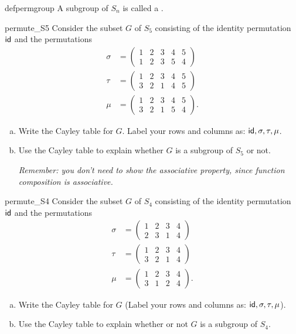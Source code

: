 \begin{defn}{defpermgroup}
A subgroup of $S_n$ is called a .
\end{defn}

\begin{exercise}{permute_S5}
Consider the subset $G$ of $S_5$ consisting of the identity
permutation ${\sf{i}d}$ and the permutations 
\begin{align*}
\sigma
& =
\begin{pmatrix}
1 & 2 & 3 & 4 & 5 \\
1 & 2 & 3 & 5 & 4
\end{pmatrix} \\
\tau
& =
\begin{pmatrix}
1 & 2 & 3 & 4 & 5 \\
3 & 2 & 1 & 4 & 5
\end{pmatrix} \\
\mu
& =
\begin{pmatrix}
1 & 2 & 3 & 4 & 5 \\
3 & 2 & 1 & 5 & 4
\end{pmatrix}.
\end{align*}
\begin{enumerate}[(a)]
\item
Write the Cayley table for $G$. Label your rows and columns as: ${\sf{i}d}, \sigma, \tau, \mu$.
\item
Use the Cayley table to explain whether $G$ is a subgroup of $S_5$ or not.  

\medskip
\emph{Remember: you don't need to show the associative property, since function composition is associative.}
\end{enumerate}
\end{exercise}

\begin{exercise}{permute_S4}
Consider the subset $G$ of $S_4$ consisting of the identity
permutation ${\sf{i}d}$ and the permutations 
\begin{align*}
\sigma
& =
\begin{pmatrix}
1 & 2 & 3 & 4  \\
2 & 3 & 1 & 4
\end{pmatrix} \\
\tau
& =
\begin{pmatrix}
1 & 2 & 3 & 4  \\
3 & 2 & 1 & 4 
\end{pmatrix} \\
\mu
& =
\begin{pmatrix}
1 & 2 & 3 & 4  \\
3 & 1 & 2 & 4 
\end{pmatrix}.
\end{align*}
\begin{enumerate}[(a)]
\item
Write the Cayley table for $G$ (Label your rows and columns as: ${\sf{i}d}, \sigma, \tau, \mu$).
\item
Use the Cayley table to explain whether or not $G$ is a subgroup of $S_4$.
\end{enumerate}
\end{exercise}

